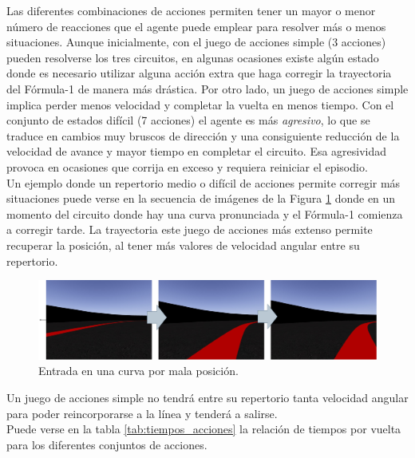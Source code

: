 Las diferentes combinaciones de acciones permiten tener un mayor o menor número de reacciones que el agente puede emplear para resolver más o menos situaciones. Aunque inicialmente, con el juego de acciones simple (3 acciones) pueden resolverse los tres circuitos, en algunas ocasiones existe algún estado donde es necesario utilizar alguna acción extra que haga corregir la trayectoria del Fórmula-1 de manera más drástica. Por otro lado, un juego de acciones simple implica perder menos velocidad y completar la vuelta en menos tiempo. Con el conjunto de estados difícil (7 acciones) el agente es más \textit{agresivo}, lo que se traduce en cambios muy bruscos de dirección y una consiguiente reducción de la velocidad de avance y mayor tiempo en completar el circuito. Esa agresividad provoca en ocasiones que corrija en exceso y requiera reiniciar el episodio.\\

Un ejemplo donde un repertorio medio o difícil de acciones permite corregir más situaciones puede verse en la secuencia de imágenes de la Figura \ref{fig:ataque-curva} donde en un momento del circuito donde hay una curva pronunciada y el Fórmula-1 comienza a corregir tarde. La trayectoria este juego de acciones más extenso permite recuperar la posición, al tener más valores de velocidad angular entre su repertorio.

\begin{figure}[ht!]
    \centering \includegraphics[width=1\columnwidth]{./figures/chapter_5/curva_pasada.png}
    \caption{Entrada en una curva por mala posición.}\label{fig:ataque-curva}
\end{figure}

Un juego de acciones simple no tendrá entre su repertorio tanta velocidad angular para poder reincorporarse a la línea y tenderá a salirse.\\

Puede verse en la tabla \ref{tab:tiempos_acciones} la relación de tiempos por vuelta para los diferentes conjuntos de acciones.

